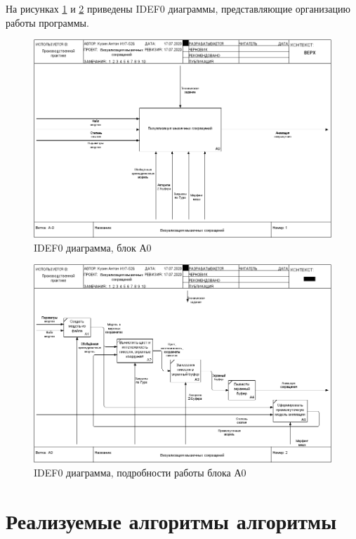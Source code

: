 На рисунках \ref{fig:01a-0} и \ref{fig:02a0} приведены IDEF0 диаграммы, представляющие организацию работы программы.
\begin{figure}
	\centering
	\includegraphics[width=\linewidth, angle=90]{01_A-0}
	\caption[IDEF0 диаграмма, блок А0]{IDEF0 диаграмма, блок А0}
	\label{fig:01a-0}
\end{figure}
\begin{figure}
	\centering
	\includegraphics[width=0.7\linewidth]{02_A0}
	\caption[IDEF0 диаграмма, подробности работы блока А0]{IDEF0 диаграмма, подробности работы блока А0}
	\label{fig:02a0}
\end{figure}

\section{Реализуемые алгоритмы алгоритмы}
\label{sec:algs}
